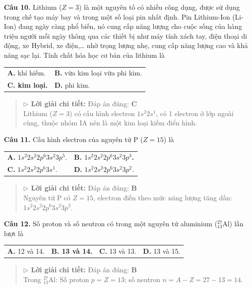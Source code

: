 \documentclass[11pt,a4paper]{article}
\begin{document}
\textbf{Câu 10.} Lithium ($Z = 3$) là một nguyên tố có nhiều công dụng, được sử dụng trong chế tạo máy bay và trong một số loại pin nhất định. Pin Lithium-Ion (Li-Ion) đang ngày càng phổ biến, nó cung cấp năng lượng cho cuộc sống của hàng triệu người mỗi ngày thông qua các thiết bị như máy tính xách tay, điện thoại di động, xe Hybrid, xe điện,… nhờ trọng lượng nhẹ, cung cấp năng lượng cao và khả năng sạc lại. Tính chất hóa học cơ bản của lithium là
\begin{tabularx}{\textwidth}{@{}XX@{}}
\textbf{A.} khí hiếm. & \textbf{B.} vừa kim loại vừa phi kim. \\
\textbf{\color{red} C. kim loại.} & \textbf{D.} phi kim. \\
\end{tabularx}
\begin{quote}\small
{\color{myBlue}\textbf{$\triangleright$ Lời giải chi tiết:}} Đáp án đúng: \textbf{\color{red} C}\\
Lithium ($Z = 3$) có cấu hình electron $1s^2 2s^1$, có 1 electron ở lớp ngoài cùng, thuộc nhóm IA nên là một kim loại kiềm điển hình.
\end{quote}
\vspace{2pt}


\textbf{Câu 11.} Cấu hình electron của nguyên tử P ($Z = 15$) là
\begin{tabularx}{\textwidth}{@{}XX@{}}
\textbf{A.} $1s^2 2s^2 2p^6 3s^2 3p^5$. & \textbf{\color{red} B. $1s^2 2s^2 2p^6 3s^2 3p^3$.} \\
\textbf{C.} $1s^2 2s^2 2p^6 3s^1$. & \textbf{D.} $1s^2 2s^2 2p^6 3s^2 3p^2$. \\
\end{tabularx}
\begin{quote}\small
{\color{myBlue}\textbf{$\triangleright$ Lời giải chi tiết:}} Đáp án đúng: \textbf{\color{red} B}\\
Nguyên tử P có $Z = 15$, electron điền theo mức năng lượng tăng dần: $1s^2 2s^2 2p^6 3s^2 3p^3$.
\end{quote}
\vspace{2pt}


\textbf{Câu 12.} Số proton và số neutron có trong một nguyên tử aluminium ($^{27}_{13}\text{Al}$) lần lượt là
\begin{tabularx}{\textwidth}{@{}XXXX@{}}
\textbf{A.} 12 và 14. & \textbf{\color{red} B. 13 và 14.} & \textbf{C.} 13 và 13. & \textbf{D.} 13 và 15. \\
\end{tabularx}
\begin{quote}\small
{\color{myBlue}\textbf{$\triangleright$ Lời giải chi tiết:}} Đáp án đúng: \textbf{\color{red} B}\\
Trong $^{27}_{13}\text{Al}$: Số proton $p = Z = 13$; số neutron $n = A - Z = 27 - 13 = 14$.
\end{quote}
\vspace{2pt}
\end{document}
